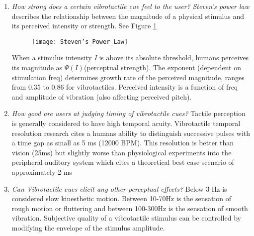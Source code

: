 \begin{enumerate}
    \item \emph{How strong does a certain vibrotactile cue feel to the user?}
\textit{Steven's power law} describes the relationship between the magnitude of a physical stimulus and its perceived intensity or strength. See Figure \ref{fig:StevensPowerLaw}
\begin{figure}[H]
    \texttt{[image: Steven's\_Power\_Law]}
    \label{fig:StevensPowerLaw}
\end{figure}
When a stimulus intensity \textit{I} is above its absolute threshold, humans perceives its magnitude as \begin{math}\Psi(I)\end{math}(perceptual strength). The exponent (dependent on stimulation freq) determines growth rate of the perceived magnitude, ranges from 0.35 to 0.86 for vibrotactiles. Perceived intensity is a function of freq and amplitude of vibration (also affecting perceived pitch).
    \item \emph{How good are users at judging timing of vibrotactile cues?}
Tactile perception is generally considered to have high temporal acuity.
Vibrotactile temporal resolution research cites a humans ability to distinguish successive pulses with a time gap as small as 5 ms (12000 BPM). This resolution is better than vision (25ms) but slightly worse than physiological experiments into the peripheral auditory system which cites a theoretical best case scenario of approximately 2 ms \cite{fishbach2001auditory} \cite{parsons2006neurobiology}
    \item \emph{Can Vibrotactile cues elicit any other perceptual effects?} Below 3 Hz is considered slow kinesthetic motion. Between 10-70Hz is the sensation of rough motion or fluttering and between 100-300Hz is the sensation of smooth vibration. Subjective quality of a vibrotactile stimulus can be controlled by modifying the envelope of the stimulus amplitude.
\end{enumerate}

